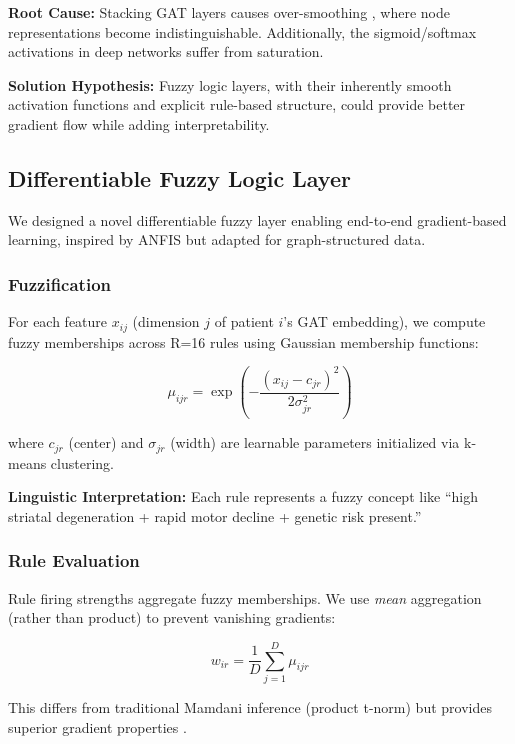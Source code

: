 \documentclass[conference]{IEEEtran}
\begin{document}
\textbf{Root Cause:} Stacking GAT layers causes over-smoothing \cite{li2018deeper}, where node representations become indistinguishable. Additionally, the sigmoid/softmax activations in deep networks suffer from saturation.

\textbf{Solution Hypothesis:} Fuzzy logic layers, with their inherently smooth activation functions and explicit rule-based structure, could provide better gradient flow while adding interpretability.

\subsection{Differentiable Fuzzy Logic Layer}

We designed a novel differentiable fuzzy layer enabling end-to-end gradient-based learning, inspired by ANFIS \cite{jang1993anfis} but adapted for graph-structured data.

\subsubsection{Fuzzification}
For each feature $x_{ij}$ (dimension $j$ of patient $i$'s GAT embedding), we compute fuzzy memberships across R=16 rules using Gaussian membership functions:

\begin{equation}
\mu_{ijr} = \exp\left(-\frac{(x_{ij} - c_{jr})^2}{2\sigma_{jr}^2}\right)
\end{equation}

where $c_{jr}$ (center) and $\sigma_{jr}$ (width) are learnable parameters initialized via k-means clustering.

\textbf{Linguistic Interpretation:} Each rule represents a fuzzy concept like ``high striatal degeneration + rapid motor decline + genetic risk present.''

\subsubsection{Rule Evaluation}
Rule firing strengths aggregate fuzzy memberships. We use \textit{mean} aggregation (rather than product) to prevent vanishing gradients:

\begin{equation}
w_{ir} = \frac{1}{D}\sum_{j=1}^D \mu_{ijr}
\end{equation}

This differs from traditional Mamdani inference (product t-norm) but provides superior gradient properties \cite{wang2015differentiable}.
\end{document}
